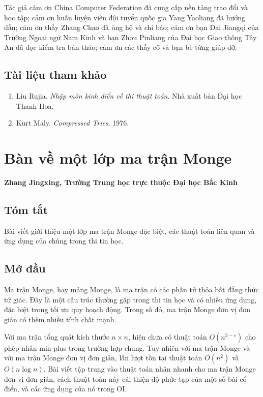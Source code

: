 \documentclass[11pt]{article}
\begin{document}
Tác giả cảm ơn China Computer Federation đã cung cấp nền tảng trao đổi và học
tập; cảm ơn huấn luyện viên đội tuyển quốc gia Yang Yaoliang đã hướng dẫn; cảm
ơn thầy Zhang Chao đã ủng hộ và chỉ bảo; cảm ơn bạn Dai Jiangqi của Trường
Ngoại ngữ Nam Kinh và bạn Zhou Pinliang của Đại học Giao thông Tây An đã đọc
kiểm tra bản thảo; cảm ơn các thầy cô và bạn bè từng giúp đỡ.

\subsection*{Tài liệu tham khảo}

\begin{enumerate}
  \item Liu Rujia. \emph{Nhập môn kinh điển về thi thuật toán}. Nhà xuất bản
  Đại học Thanh Hoa.
  \item Kurt Maly. \emph{Compressed Tries}. 1976.
\end{enumerate}

\section{Bàn về một lớp ma trận Monge}

\begin{center}
\textbf{Zhang Jingxing, Trường Trung học trực thuộc Đại học Bắc Kinh}
\end{center}

\subsection*{Tóm tắt}

Bài viết giới thiệu một lớp ma trận Monge đặc biệt, các thuật toán liên quan
và ứng dụng của chúng trong thi tin học.

\subsection{Mở đầu}

Ma trận Monge, hay mảng Monge, là ma trận có các phần tử thỏa bất đẳng thức tứ
giác. Đây là một cấu trúc thường gặp trong thi tin học và có nhiều ứng dụng,
đặc biệt trong tối ưu quy hoạch động. Trong số đó, ma trận Monge đơn vị đơn
giản có thêm nhiều tính chất mạnh.

Với ma trận tổng quát kích thước $n\times n$, hiện chưa có thuật toán
$O(n^{3-\varepsilon})$ cho phép nhân min-plus trong trường hợp chung. Tuy
nhiên với ma trận Monge và với ma trận Monge đơn vị đơn giản, lần lượt tồn tại
thuật toán $O(n^2)$ và $O(n\log n)$. Bài viết tập trung vào thuật toán nhân
nhanh cho ma trận Monge đơn vị đơn giản, cách thuật toán này cải thiện độ phức
tạp của một số bài cổ điển, và các ứng dụng của nó trong OI.
\end{document}
